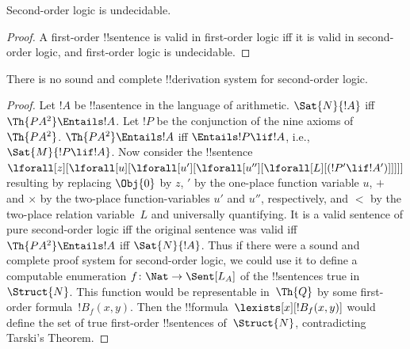 \documentclass[../../../include/open-logic-section]{subfiles}
\begin{document}



\begin{thm}
Second-order logic is undecidable.
\end{thm}

\begin{proof}
A first-order !!{sentence} is valid in first-order logic iff it is
valid in second-order logic, and first-order logic is undecidable.
\end{proof}

\begin{thm}
There is no sound and complete !!{derivation} system for second-order logic.
\end{thm}

\begin{proof}
Let $!A$ be !!a{sentence} in the language of arithmetic.  $\Sat{N}{!A}$
iff $\Th{PA^2} \Entails !A$. Let $!P$ be the conjunction of the nine
axioms of~$\Th{PA^2}$. $\Th{PA^2} \Entails !A$ iff $\Entails !P \lif
!A$, i.e., $\Sat{M}{!P \lif !A}$. Now consider the !!{sentence}
$\lforall[z][\lforall[u][\lforall[u'][\lforall[u''][\lforall[L][(!P' \lif !A')]]]]]$ resulting by
replacing $\Obj{0}$ by $z$, $\prime$ by the one-place function
variable $u$, $+$ and $\times$ by the two-place function-variables 
$u'$ and  $u''$, respectively,
and $<$ by the two-place relation variable~$L$ and
universally quantifying.  It is a valid sentence of pure second-order
logic iff the original sentence was valid iff $\Th{PA^2} \Entails !A$
iff $\Sat{N}{!A}$.  Thus if there were a sound and complete proof
system for second-order logic, we could use it to define a computable
enumeration $f\colon \Nat \to \Sent[L_A]$ of the !!{sentence}s true
in~$\Struct{N}$. This function would be representable in~$\Th{Q}$ by
some first-order formula~$!B_f(x, y)$. Then the
!!{formula}~$\lexists[x][!B_f(x, y)]$ would define the set of true
first-order !!{sentence}s of~$\Struct{N}$, contradicting Tarski's
Theorem.
\end{proof}
\end{document}
